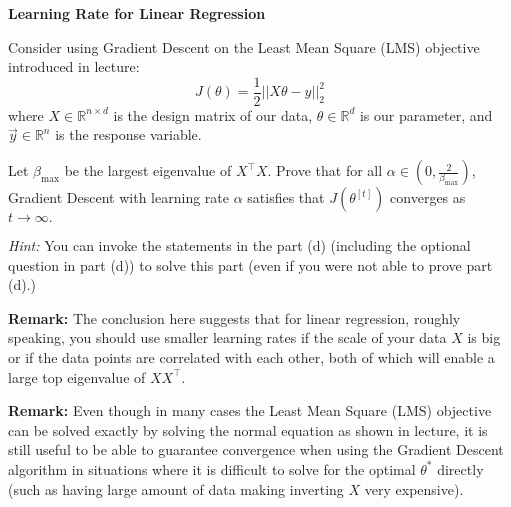 \item {} {\bf Learning Rate for Linear Regression}

Consider using Gradient Descent on the Least Mean Square (LMS) objective introduced in lecture:
\begin{equation*}
	J(\theta) = \frac{1}{2}||X\theta - y||_2^2
\end{equation*}
where $X\in\mathbb{R}^{n\times d}$ is the design matrix of our data, $\theta\in\mathbb{R}^d$ is our parameter, and $\vec{y}\in\mathbb{R}^n$  is the response variable. 

Let $\beta_{\max}$ be the largest eigenvalue of $X^\top X$. Prove that for all  $\alpha \in (0, \frac{2}{\beta_{\max}})$, Gradient Descent with learning rate $\alpha$ satisfies that $J(\theta^{[t]})$ converges as $t\rightarrow \infty.$
	
\textit{Hint:}	You can invoke the statements in the part (d) (including the optional question in part (d)) to solve this part (even if you were not able to prove part (d).)

\textbf{Remark:} The conclusion here suggests that for linear regression, roughly speaking, you should use smaller learning rates if the scale of your data $X$ is big or if the data points are correlated with each other, both of which will enable a large top eigenvalue of $XX^\top$.

\textbf{Remark:} Even though in many cases the Least Mean Square (LMS) objective can be solved 
exactly by solving the normal equation as shown in lecture, it is still useful to be able to guarantee convergence
when using the Gradient Descent algorithm in situations where it is difficult to solve
for the optimal $\theta^*$ directly (such as having large amount of data making inverting $X$
very expensive).
